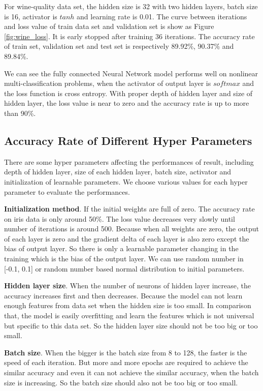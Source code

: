 For wine-quality data set, the hidden size is 32 with two hidden layers, batch size is 16, activator is \(tanh\) and learning rate is 0.01. The curve between iterations and loss value of train data set and validation set is show as Figure \ref{fig:wine_loss}. It is early stopped after training 36 iterations. The accuracy rate of train set, validation set and test set is respectively 89.92\%, 90.37\% and 89.84\%.

We can see the fully connected Neural Network model performs well on nonlinear multi-classification problems, when the activator of output layer is \(softmax\) and the loss function is cross entropy. With proper depth of hidden layer and size of hidden layer, the loss value is near to zero and the accuracy rate is up to more than 90\%.

\subsection{Accuracy Rate of Different Hyper Parameters}
There are some hyper parameters affecting the performances of result, including depth of hidden layer, size of each hidden layer, batch size, activator and initialization of learnable parameters. We choose various values for each hyper parameter to evaluate the performances.

\textbf{Initialization method}. If the initial weights are full of zero. The accuracy rate on iris data is only around 50\%. The loss value decreases very slowly until number of iterations is around 500. Because when all weights are zero, the output of each layer is zero and the gradient delta of each layer is also zero except the  bias of output layer. So there is only a learnable parameter changing in the training which is the bias of the output layer. We can use random number in [-0.1, 0.1] or random number based normal distribution to initial parameters.

\textbf{Hidden layer size}. When the number of neurons of hidden layer increase, the accuracy increases first and then decreases. Because the model can not learn enough features from data set when the hidden size is too small. In comparison that, the model is easily overfitting and learn the features which is not universal but specific to this data set. So the hidden layer size should not be too big or too small.

\textbf{Batch size}.
When the bigger is the batch size from 8 to 128, the faster is the speed of each iteration. But more and more epochs are required to achieve the similar accuracy and even it can not achieve the similar accuracy, when the batch size is increasing. So the batch size should also not be too big or too small.
